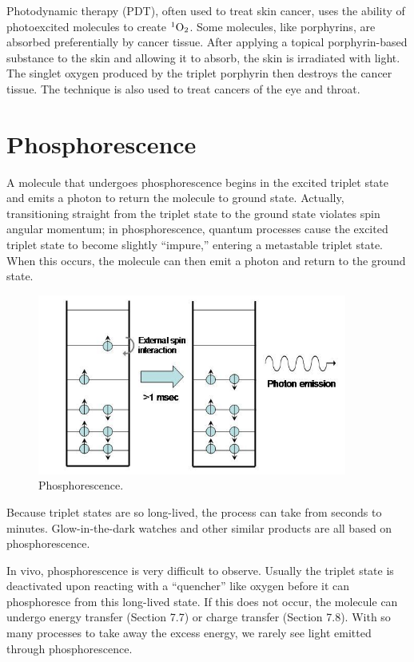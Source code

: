 Photodynamic therapy (PDT), often used to treat skin cancer, uses the ability of photoexcited molecules to create $^1{\rm O}_2$.  Some molecules, like porphyrins, are absorbed preferentially by cancer tissue.  After applying a topical porphyrin-based substance to the skin and allowing it to absorb, the skin is irradiated with light.  The singlet oxygen produced by the triplet porphyrin then destroys the cancer tissue.  The technique is also used to treat cancers of the eye and throat.

\section{Phosphorescence}

A molecule that undergoes phosphorescence begins in the excited triplet state and emits a photon to return the molecule to ground state.  Actually, transitioning straight from the triplet state to the ground state violates spin angular momentum; in phosphorescence, quantum processes cause the excited triplet state to become slightly “impure,” entering a metastable triplet state.  When this occurs, the molecule can then emit a photon and return to the ground state.  

\begin{figure}[h]
	\centering
	\includegraphics[width=4.0in]{./figures/Topic7/Fig7-6.jpg}
	\caption{Phosphorescence.}
	\label{Fig7-6}
\end{figure}
Because triplet states are so long-lived, the process can take from seconds to minutes.  Glow-in-the-dark watches and other similar products are all based on phosphorescence.

In vivo, phosphorescence is very difficult to observe.  Usually the triplet state is deactivated upon reacting with a ``quencher'' like oxygen before it can phosphoresce from this long-lived state.  If this does not occur, the molecule can undergo energy transfer (Section 7.7) or charge transfer (Section 7.8).  With so many processes to take away the excess energy, we rarely see light emitted through phosphorescence.

